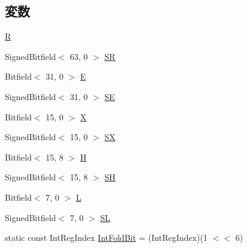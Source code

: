 \subsection*{変数}
\begin{DoxyCompactItemize}
\item 
\hyperlink{namespaceX86ISA_acb95449a94688af33f6e9bb090cf2936}{R}
\item 
SignedBitfield$<$ 63, 0 $>$ \hyperlink{namespaceX86ISA_a62886be1bcbf64566d5d2f90a0d27ffe}{SR}
\item 
Bitfield$<$ 31, 0 $>$ \hyperlink{namespaceX86ISA_a71b154dead8fe7930c20fe9b4ce8ae3b}{E}
\item 
SignedBitfield$<$ 31, 0 $>$ \hyperlink{namespaceX86ISA_abbbf2eaf763539e94e31a3f4a250c99a}{SE}
\item 
Bitfield$<$ 15, 0 $>$ \hyperlink{namespaceX86ISA_a8c8da34a185dfa074d1b9976b7ce7a93}{X}
\item 
SignedBitfield$<$ 15, 0 $>$ \hyperlink{namespaceX86ISA_a4e9bd10f5da85e48ae4377e8962cf60a}{SX}
\item 
Bitfield$<$ 15, 8 $>$ \hyperlink{namespaceX86ISA_a1cad4492b2894c49eeb063c9a9569580}{H}
\item 
SignedBitfield$<$ 15, 8 $>$ \hyperlink{namespaceX86ISA_a8f9656f93dee1143c4946caffa827444}{SH}
\item 
Bitfield$<$ 7, 0 $>$ \hyperlink{namespaceX86ISA_a0485da3ef528ce3058f6f335248c0764}{L}
\item 
SignedBitfield$<$ 7, 0 $>$ \hyperlink{namespaceX86ISA_aa51df4793b85b67a85272738df83bcfa}{SL}
\item 
static const IntRegIndex \hyperlink{namespaceX86ISA_a839d36f6b65e52c16579f4cdb5165f15}{IntFoldBit} = (IntRegIndex)(1 $<$$<$ 6)
\end{DoxyCompactItemize}
